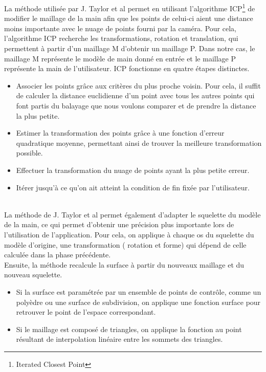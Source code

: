 La méthode utilisée par J. Taylor et al \cite{export:217428} permet en utilisant l'algorithme
ICP\footnote{Iterated Closest Point} \cite{121791} de modifier le maillage de la main afin
que les points de celui-ci aient une distance moins importante avec le nuage de points fourni par la 
caméra. Pour cela, l'algorithme ICP recherche les transformations, rotation et translation, qui permettent 
à partir d'un maillage M d'obtenir un maillage P. Dans notre cas, le maillage M représente le modèle de main donné en entrée
et le maillage P représente la main de l'utilisateur. ICP fonctionne en quatre étapes distinctes.
\begin{itemize}
  \item Associer les points grâce aux critères du plus proche voisin. Pour cela, il suffit de calculer la distance euclidienne d'un
   point avec tous les autres points qui font partis du balayage que nous voulons comparer et de prendre la distance la plus petite.
  \item Estimer la transformation des points grâce à une fonction d'erreur quadratique moyenne, permettant ainsi de trouver la meilleure
  transformation possible.
  \item Effectuer la transformation du nuage de points ayant la plus petite erreur.
  \item Itérer jusqu'à ce qu'on ait atteint la condition de fin fixée par l'utilisateur.
\end{itemize} 
\ \\

La méthode de J. Taylor et al \cite{export:217428} permet également d'adapter le squelette du modèle de la 
main, ce qui permet d'obtenir une précision plus importante lors de l'utilisation de l'application.
Pour cela, on applique à chaque os du squelette du modèle d'origine, 
une transformation ( rotation et forme) qui dépend de celle calculée dans la phase précédente.\\

Ensuite, la méthode recalcule la surface à partir du nouveaux maillage et du nouveau squelette.
\begin{itemize}
\item Si la surface est paramétrée par un ensemble de points de contrôle, comme un polyèdre
ou une surface de subdivision, on applique une fonction surface pour retrouver le point de l'espace correspondant.
\item Si le maillage est composé de triangles, on applique la fonction au point résultant de interpolation linéaire entre les sommets des triangles.\\
\end{itemize}

